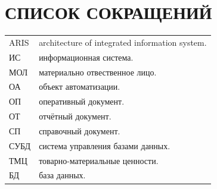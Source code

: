 \documentclass[12pt, a4paper, simple]{eskdtext}
\begin{document}
    \newpage
    \section*{СПИСОК СОКРАЩЕНИЙ}
    
    \begin{tabular}{ll} 
        ARIS    & architecture of integrated information system.\\
        ИС      & информационная система.\\
        МОЛ     & материально отвественное лицо.\\
        ОА      & объект автоматизации.\\
        ОП      & оперативный документ.\\
        ОТ      & отчётный документ.\\
        СП      & справочный документ.\\
        СУБД    & система управления базами данных.\\
        ТМЦ     & товарно-материальные ценности.\\
        БД      & база данных.\\
    \end{tabular}
    
    \newpage
\end{document}
